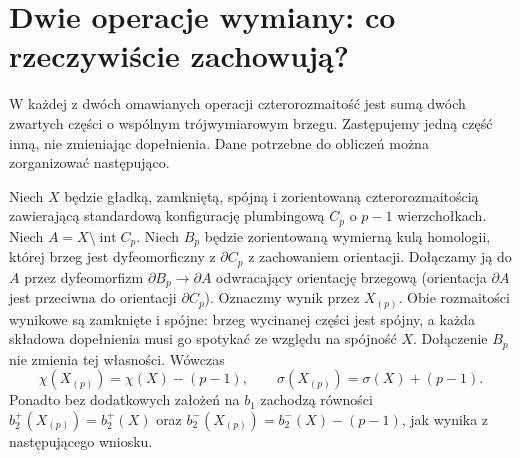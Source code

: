 \section{Dwie operacje wymiany: co rzeczywiście zachowują?}
\label{sec:tg-syn-exchange}

W każdej z dwóch omawianych operacji czterorozmaitość
jest sumą dwóch zwartych części o wspólnym trójwymiarowym
brzegu. Zastępujemy jedną część inną, nie zmieniając dopełnienia.
Dane potrzebne do obliczeń można zorganizować następująco.

\begin{center}
\end{center}

\begin{twierdzenie}
\label{thm:tg-syn-rational}
Niech $X$ będzie gładką, zamkniętą, spójną i zorientowaną
czterorozmaitością zawierającą standardową konfigurację
plumbingową $C_p$ o $p-1$ wierzchołkach. Niech $A=X\setminus\operatorname{int}C_p$.
Niech $B_p$ będzie zorientowaną wymierną kulą
homologii, której brzeg jest dyfeomorficzny
z $\partial C_p$ z zachowaniem orientacji.
Dołączamy ją do $A$ przez dyfeomorfizm
$\partial B_p\to\partial A$ odwracający orientację
brzegową (orientacja $\partial A$ jest przeciwna
do orientacji $\partial C_p$). Oznaczmy wynik
przez $X_{(p)}$. Obie rozmaitości wynikowe są
zamknięte i spójne: brzeg wycinanej części jest
spójny, a każda składowa dopełnienia musi go spotykać
ze względu na spójność $X$. Dołączenie $B_p$
nie zmienia tej własności.
Wówczas
\[
 \chi(X_{(p)})=\chi(X)-(p-1),\qquad
 \sigma(X_{(p)})=\sigma(X)+(p-1).
\]
Ponadto bez dodatkowych założeń na $b_1$ zachodzą
równości $b_2^+(X_{(p)})=b_2^+(X)$ oraz
$b_2^-(X_{(p)})=b_2^-(X)-(p-1)$,
jak wynika z następującego wniosku.
\end{twierdzenie}

